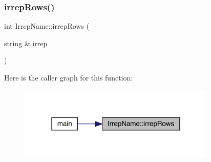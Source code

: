 \subsubsection{\texorpdfstring{irrepRows()}{irrepRows()}}
{\footnotesize\ttfamily int Irrep\+Name\+::irrep\+Rows (\begin{DoxyParamCaption}\item[{string \&}]{irrep }\end{DoxyParamCaption})}

Here is the caller graph for this function\+:\nopagebreak
\begin{figure}[H]
\begin{center}
\leavevmode
\includegraphics[width=267pt]{d8/dcc/namespaceIrrepName_a3964736788de2a425b5a41ff069f907b_icgraph}
\end{center}
\end{figure}
